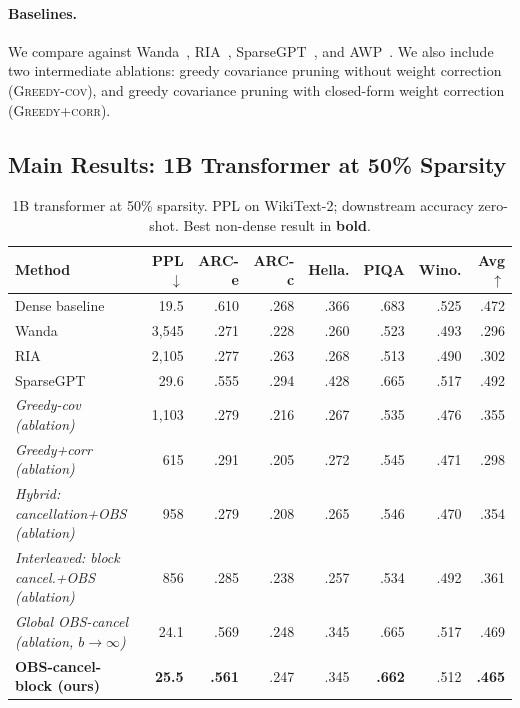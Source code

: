 \documentclass{article}
\begin{document}
\paragraph{Baselines.}
We compare against Wanda~\citep{sun2023simple}, RIA~\citep{zhang2024plug},
SparseGPT~\citep{frantar2023sparsegpt}, and AWP~\citep{liu2025awp}. We also
include two intermediate ablations: greedy covariance pruning without weight
correction (\textsc{Greedy-cov}), and greedy covariance pruning with closed-form weight
correction (\textsc{Greedy+corr}).

\subsection{Main Results: 1B Transformer at 50\% Sparsity}
\label{sec:main_results}

\begin{table}[htbp]
  \centering
  \caption{%
    1B transformer at 50\% sparsity.
    PPL on WikiText-2; downstream accuracy zero-shot.
    Best non-dense result in \textbf{bold}.
  }
  \label{tab:main_1b}
  \small
  \begin{tabular}{lrrrrrrr}
    \toprule
    Method & PPL$\downarrow$ & ARC-e & ARC-c & Hella. & PIQA & Wino. & Avg$\uparrow$ \\
    \midrule
    Dense baseline       & 19.5  & .610 & .268 & .366 & .683 & .525 & .472 \\
    \midrule
    Wanda                & 3{,}545 & .271 & .228 & .260 & .523 & .493 & .296 \\
    RIA                  & 2{,}105 & .277 & .263 & .268 & .513 & .490 & .302 \\
    SparseGPT            &    29.6 & .555 & .294 & .428 & .665 & .517 & .492 \\
    \midrule
    \textit{Greedy-cov (ablation)}                      & 1{,}103 & .279 & .216 & .267 & .535 & .476 & .355 \\
    \textit{Greedy+corr (ablation)}                     &     615 & .291 & .205 & .272 & .545 & .471 & .298 \\
    \textit{Hybrid: cancellation+OBS (ablation)}        &     958 & .279 & .208 & .265 & .546 & .470 & .354 \\
    \textit{Interleaved: block cancel.+OBS (ablation)}  &     856 & .285 & .238 & .257 & .534 & .492 & .361 \\
    \textit{Global OBS-cancel (ablation, $b\to\infty$)} &  24.1   & .569 & .248 & .345 & .665 & .517 & .469 \\
    \midrule
    \textbf{OBS-cancel-block (ours)}  & \textbf{25.5} & \textbf{.561} & .247 & .345 & \textbf{.662} & .512 & \textbf{.465} \\
    \bottomrule
  \end{tabular}
\end{table}
\end{document}
